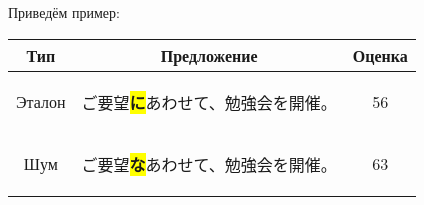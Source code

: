 Приведём пример: 

\begin{tabular}{|c|c|c|} \hline
	Тип & Предложение & Оценка \\ \hline
	Эталон & \begin{CJK}{UTF8}{min} ご要望\colorbox{yellow}{\textbf{に}}あわせて、勉強会を開催。 \end{CJK} & 56 \\
	Шум & \begin{CJK}{UTF8}{min} ご要望\colorbox{yellow}{\textbf{な}}あわせて、勉強会を開催。 \end{CJK} & 63 \\ \hline
\end{tabular}


